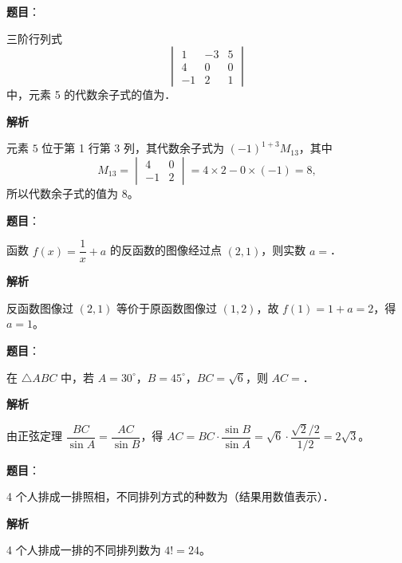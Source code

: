 \begin{answer}

\textbf{题目}：

三阶行列式
\nopagebreak[4]
\[
\begin{vmatrix}
1 & -3 & 5\\
4 & 0 & 0\\
-1 & 2 & 1
\end{vmatrix}
\]
中，元素 5 的代数余子式的值为\gkblank{}．

\textbf{解析}

元素 \(5\) 位于第 1 行第 3 列，其代数余子式为 \((-1)^{1+3}M_{13}\)，其中
\nopagebreak[4]
\[
M_{13}=
\begin{vmatrix}
4 & 0\\
-1 & 2
\end{vmatrix}
=4\times 2-0\times(-1)=8,
\]
所以代数余子式的值为 \(8\)。


\end{answer}
\begin{answer}

\textbf{题目}：

函数 \(f(x)=\dfrac{1}{x}+a\) 的反函数的图像经过点 \((2,1)\)，则实数 \(a=\)\gkblank{}．

\textbf{解析}

反函数图像过 \((2,1)\) 等价于原函数图像过 \((1,2)\)，故 \(f(1)=1+a=2\)，得 \(a=1\)。


\end{answer}
\begin{answer}

\textbf{题目}：

在 \(\triangle ABC\) 中，若 \(A=30^{\circ}\)，\(B=45^{\circ}\)，\(BC=\sqrt{6}\)，则 \(AC=\)\gkblank{}．

\textbf{解析}

由正弦定理 \(\dfrac{BC}{\sin A}=\dfrac{AC}{\sin B}\)，得 \(AC=BC\cdot\dfrac{\sin B}{\sin A}=\sqrt{6}\cdot\dfrac{\sqrt{2}/2}{1/2}=2\sqrt{3}\)。


\end{answer}
\begin{answer}

\textbf{题目}：

4 个人排成一排照相，不同排列方式的种数为\gkblank{}（结果用数值表示）．

\textbf{解析}

4 个人排成一排的不同排列数为 \(4!=24\)。


\end{answer}
